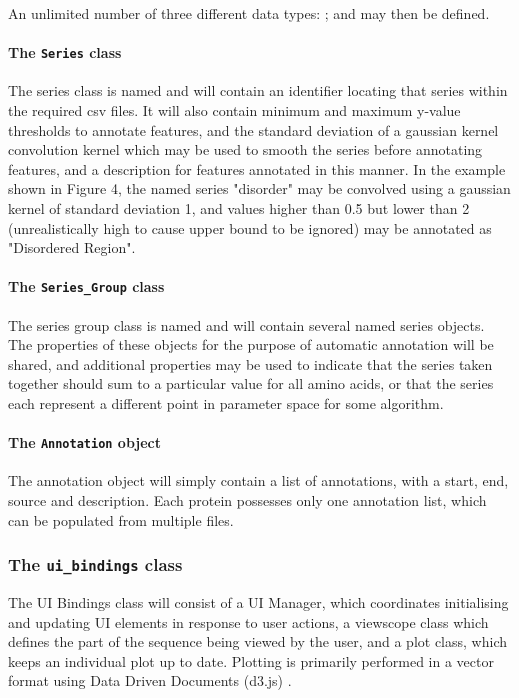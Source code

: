 \documentclass[fleqn,10pt]{article} %
\begin{document}
An unlimited number of three different data types: ;  and  may then be defined.

\paragraph{The \texttt{Series} class}

The series class is named and will contain an identifier locating that series within the required csv files. It will also contain minimum and maximum y-value thresholds to annotate features, and the standard deviation of a gaussian kernel convolution kernel which may be used to smooth the series before annotating features, and a description for features annotated in this manner. In the example shown in Figure 4, the named series "disorder" may be convolved using a gaussian kernel of standard deviation 1, and values higher than 0.5 but lower than 2 (unrealistically high to cause upper bound to be ignored) may be annotated as "Disordered Region".

\paragraph{The \texttt{Series\_Group} class}

The series group class is named and will contain several named series objects. The properties of these objects for the purpose of automatic annotation will be shared, and additional properties may be used to indicate that the series taken together should sum to a particular value for all amino acids, or that the series each represent a different point in parameter space for some algorithm.

\paragraph{The \texttt{Annotation} object}

The annotation object will simply contain a list of annotations, with a start, end, source and description. Each protein possesses only one annotation list, which can be populated from multiple files.

\subsubsection{The \texttt{ui\_bindings} class}

The UI Bindings class will consist of a UI Manager, which coordinates initialising and updating UI elements in response to user actions, a viewscope class which defines the part of the sequence being viewed by the user, and a plot class, which keeps an individual plot up to date. Plotting is primarily performed in a vector format using Data Driven Documents (d3.js) \cite{Bostock2011}. 
\end{document}
